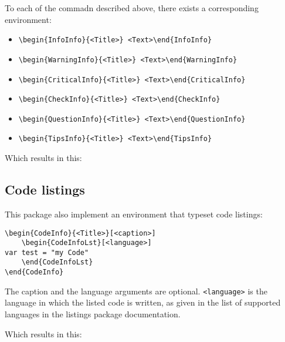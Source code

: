 \documentclass[a4paper, 11pt, oneside, fleqn]{article}
\begin{document}
To each of the commadn described above, there exists a corresponding environment:
\begin{itemize}
	\item \verb|\begin{InfoInfo}{<Title>} <Text>\end{InfoInfo}|
	\item \verb|\begin{WarningInfo}{<Title>} <Text>\end{WarningInfo}|
	\item \verb|\begin{CriticalInfo}{<Title>} <Text>\end{CriticalInfo}|
	\item \verb|\begin{CheckInfo}{<Title>} <Text>\end{CheckInfo}|
	\item \verb|\begin{QuestionInfo}{<Title>} <Text>\end{QuestionInfo}|
	\item \verb|\begin{TipsInfo}{<Title>} <Text>\end{TipsInfo}|
\end{itemize}

Which results in this:

\subsection{Code listings}
This package also implement an environment that typeset code listings:
\begin{verbatim}
\begin{CodeInfo}{<Title>}[<caption>]
	\begin{CodeInfoLst}[<language>]
var test = "my Code"
	\end{CodeInfoLst}
\end{CodeInfo}
\end{verbatim}

The caption and the language arguments are optional. \verb|<language>| is the language in which the listed code is written, as given in the list of supported languages in the listings package documentation.

Which results in this:
\end{document}
